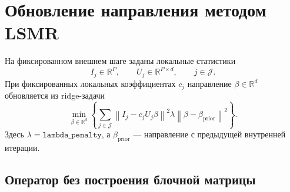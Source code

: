 
\section{Обновление направления методом LSMR}
\label{sec:lsmr-solver}

На фиксированном внешнем шаге заданы локальные статистики
\[
 I_j\in\mathbb R^P,
 \qquad
 U_j\in\mathbb R^{P\times d},
 \qquad j\in\mathcal J.
\]
При фиксированных локальных коэффициентах \(c_j\) направление
\(\beta\in\mathbb R^d\) обновляется из ridge-задачи
\begin{equation}
 \min_{\beta\in\mathbb R^d}
 \left\{
  \sum_{j\in\mathcal J}
  \left\|I_j-c_jU_j\beta\right\|^2
  \lambda\left\|\beta-\beta_{\mathrm{prior}}\right\|^2
 \right\}.
 \label{eq:lsmr-ridge}
\end{equation}
Здесь \(\lambda=\texttt{lambda\_penalty}\), а
\(\beta_{\mathrm{prior}}\) --- направление с предыдущей внутренней итерации.

\subsection{Оператор без построения блочной матрицы}

